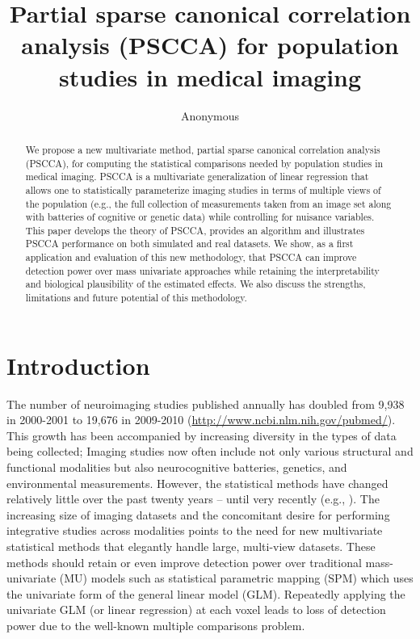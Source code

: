 \documentclass{llncs}
\begin{document}
\title{Partial sparse canonical correlation analysis (PSCCA) for population
  studies in medical imaging}
\author{Anonymous}
\maketitle              
\begin{abstract}
We propose a new multivariate method, partial sparse canonical
correlation analysis (PSCCA), for computing the statistical
comparisons needed by population studies in medical imaging.  PSCCA is a
multivariate generalization of linear regression that allows one to statistically parameterize imaging studies in terms of
multiple views of the population (e.g., the full collection of
measurements taken from an image set along with batteries of cognitive
or genetic data) while controlling for nuisance variables.  This paper
develops the theory of PSCCA, provides an algorithm and illustrates
PSCCA performance on both simulated and real datasets.  We show, as a
first application and evaluation of this new methodology, that
PSCCA can improve detection power over mass univariate approaches
while retaining the interpretability and biological plausibility of
the estimated effects.  We also discuss the strengths, limitations and
future potential of this methodology.
\end{abstract}
\section{Introduction}
The number of neuroimaging studies published annually has doubled from
9,938 in 2000-2001 to 19,676 in 2009-2010
(\url{http://www.ncbi.nlm.nih.gov/pubmed/}).  This growth has been
accompanied by increasing diversity in the types of data being
collected; Imaging studies now often include not only various
structural and functional modalities but also neurocognitive
batteries, genetics, and environmental measurements.  However, the
statistical methods have changed relatively little over the past
twenty years -- until very recently (e.g., \cite{Tosun2010a}).  The
increasing size of imaging datasets and the concomitant desire for
performing integrative studies across modalities points to the need
for new multivariate statistical methods that elegantly handle large,
multi-view datasets.  These methods should retain or even improve
detection power over traditional mass-univariate (MU) models such as
statistical parametric mapping (SPM) which uses the univariate form of
the general linear model (GLM).  Repeatedly applying the univariate GLM (or
linear regression) at each voxel leads to loss of detection power due
to the well-known multiple comparisons problem.
\end{document}
